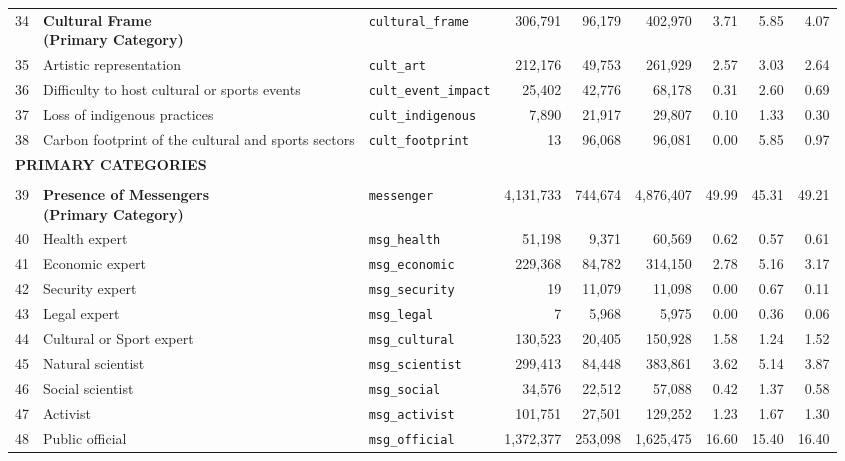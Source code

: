 \begin{longtable}{p{0.5cm}p{4.0cm}p{2.5cm}rrrrrr}
\midrule
34 & \textbf{Cultural Frame\newline (Primary Category)} & \texttt{cultural\_frame} & 306,791 & 96,179 & 402,970 & 3.71 & 5.85 & 4.07 \\
\cmidrule(lr){1-9}
35 & Artistic representation & \texttt{cult\_art} & 212,176 & 49,753 & 261,929 & 2.57 & 3.03 & 2.64 \\
36 & Difficulty to host cultural or sports events & \texttt{cult\_event\_impact} & 25,402 & 42,776 & 68,178 & 0.31 & 2.60 & 0.69 \\
37 & Loss of indigenous practices & \texttt{cult\_indigenous} & 7,890 & 21,917 & 29,807 & 0.10 & 1.33 & 0.30 \\
38 & Carbon footprint of the cultural and sports sectors & \texttt{cult\_footprint} & 13 & 96,068 & 96,081 & 0.00 & 5.85 & 0.97 \\
\midrule
\multicolumn{9}{l}{\cellcolor{gray!10}\textbf{PRIMARY CATEGORIES}} \\
\midrule
\rowcolor{gray!8}
\multicolumn{9}{l}{\textit{Actors/Messengers}} \\
\midrule
39 & \textbf{Presence of Messengers\newline (Primary Category)} & \texttt{messenger} & 4,131,733 & 744,674 & 4,876,407 & 49.99 & 45.31 & 49.21 \\
\cmidrule(lr){1-9}
40 & Health expert & \texttt{msg\_health} & 51,198 & 9,371 & 60,569 & 0.62 & 0.57 & 0.61 \\
41 & Economic expert & \texttt{msg\_economic} & 229,368 & 84,782 & 314,150 & 2.78 & 5.16 & 3.17 \\
42 & Security expert & \texttt{msg\_security} & 19 & 11,079 & 11,098 & 0.00 & 0.67 & 0.11 \\
43 & Legal expert & \texttt{msg\_legal} & 7 & 5,968 & 5,975 & 0.00 & 0.36 & 0.06 \\
44 & Cultural or Sport expert & \texttt{msg\_cultural} & 130,523 & 20,405 & 150,928 & 1.58 & 1.24 & 1.52 \\
45 & Natural scientist & \texttt{msg\_scientist} & 299,413 & 84,448 & 383,861 & 3.62 & 5.14 & 3.87 \\
46 & Social scientist & \texttt{msg\_social} & 34,576 & 22,512 & 57,088 & 0.42 & 1.37 & 0.58 \\
47 & Activist & \texttt{msg\_activist} & 101,751 & 27,501 & 129,252 & 1.23 & 1.67 & 1.30 \\
48 & Public official & \texttt{msg\_official} & 1,372,377 & 253,098 & 1,625,475 & 16.60 & 15.40 & 16.40 \\

\end{longtable}

